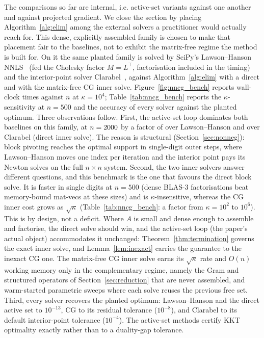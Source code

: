 The comparisons so far are internal, i.e. active-set variants against
one another and against projected gradient. We close the section by placing
Algorithm~\ref{alg:elim} among the external solvers a practitioner would actually reach for.
This dense, explicitly assembled family is chosen to make that placement fair to the
baselines, not to exhibit the matrix-free regime the method is built for. On it the same
planted family is solved by SciPy's Lawson--Hanson NNLS~\cite{lawson1974} (fed the Cholesky
factor $M = L^\top$, factorisation included in the timing) and the interior-point solver
Clarabel~\cite{clarabel2024}, against Algorithm~\ref{alg:elim} with a direct and with the
matrix-free CG inner solve. Figure~\ref{fig:nncg_bench} reports wall-clock times against $n$
at $\kappa = 10^4$; Table~\ref{tab:nncg_bench} reports the $\kappa$-sensitivity at $n = 500$
and the accuracy of every solver against the planted optimum. Three observations follow.
First, the active-set loop dominates both baselines on this family, at $n = 2000$
by a factor of \nncgBenchLHvsASD{} over Lawson--Hanson and \nncgBenchIPvsASD{} over Clarabel
(direct inner solve). The reason is structural (Section~\ref{sec:nonneg}): block pivoting
reaches the optimal support in single-digit outer steps, where Lawson--Hanson moves one index
per iteration and the interior point pays its Newton solves on the full $n \times n$ system.
Second, the two inner solvers answer different questions, and this benchmark is the one that
favours the direct block solve. It is faster in single digits at $n = 500$ (dense BLAS-3
factorisations beat memory-bound mat-vecs at these sizes) and is $\kappa$-insensitive, whereas
the CG inner cost grows as $\sqrt\kappa$ (Table~\ref{tab:nncg_bench}: a factor
\nncgBenchASCGSens{} from $\kappa = 10^2$ to $10^6$). This is by design, not a deficit. Where
$A$ is small and dense enough to assemble and factorise, the direct solve should win, and the
active-set loop (the paper's actual object) accommodates it unchanged: Theorem~\ref{thm:termination}
governs the exact inner solve, and Lemma~\ref{lem:inexact} carries the guarantee to the
inexact CG one. The matrix-free CG inner solve earns its $\sqrt\kappa$ rate and $O(n)$ working
memory only in the complementary regime, namely the Gram and structured operators of
Section~\ref{sec:reduction} that are never assembled, and warm-started parametric sweeps where
each solve reuses the previous free set. Third, every solver recovers the planted optimum:
Lawson--Hanson and the direct active set to $10^{-13}$, CG to its residual tolerance
($10^{-8}$), and Clarabel to its default interior-point tolerance ($10^{-4}$). The active-set
methods certify KKT optimality exactly rather than to a duality-gap tolerance.

